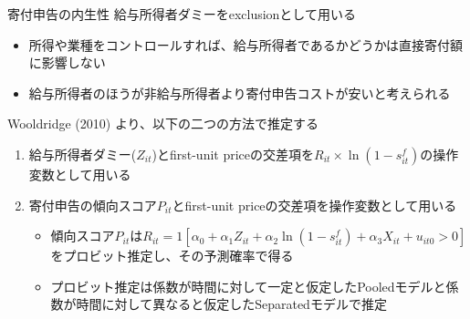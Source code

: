 \documentclass[
  ignorenonframetext,
  aspectratio=169,
]{beamer}
\providecommand{\tightlist}{%
  \setlength{\itemsep}{0pt}\setlength{\parskip}{0pt}}
\begin{document}
\begin{frame}{寄付申告の内生性}
\protect\hypertarget{ux5bc4ux4ed8ux7533ux544aux306eux5185ux751fux6027}{}
給与所得者ダミーをexclusionとして用いる

\begin{itemize}
\tightlist
\item
  所得や業種をコントロールすれば、給与所得者であるかどうかは直接寄付額に影響しない
\item
  給与所得者のほうが非給与所得者より寄付申告コストが安いと考えられる
\end{itemize}

Wooldridge (2010) より、以下の二つの方法で推定する

\begin{enumerate}
\tightlist
\item
  給与所得者ダミー(\(Z_{it}\))とfirst-unit priceの交差項を\(R_{it} \times \ln (1 - s^f_{it})\)の操作変数として用いる
\item
  寄付申告の傾向スコア\(P_{it}\)とfirst-unit priceの交差項を操作変数として用いる

  \begin{itemize}
  \tightlist
  \item
    傾向スコア\(P_{it}\)は\(R_{it} = 1[\alpha_0 + \alpha_1 Z_{it} + \alpha_2 \ln(1 - s^f_{it}) + \alpha_3 X_{it} + u_{it0} > 0]\)をプロビット推定し、その予測確率で得る
  \item
    プロビット推定は係数が時間に対して一定と仮定したPooledモデルと係数が時間に対して異なると仮定したSeparatedモデルで推定
  \end{itemize}
\end{enumerate}
\end{frame}
\end{document}
